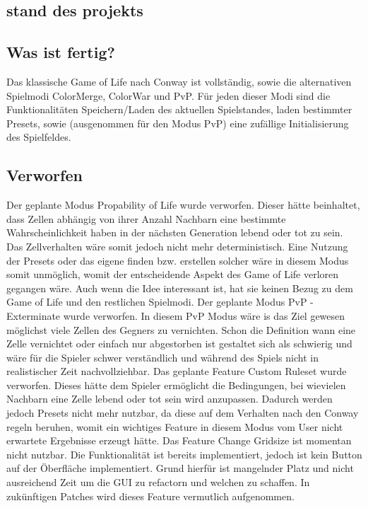 \documentclass[12pt]{article}
\theoremstyle{plain}
\begin{document}
\begin{linenumbers}
\section{stand des projekts}
\subsection{Was ist fertig?}
Das klassische Game of Life nach Conway ist vollständig, sowie die alternativen Spielmodi ColorMerge, ColorWar und PvP.
Für jeden dieser Modi sind die Funktionalitäten Speichern/Laden des aktuellen Spielstandes, laden bestimmter Presets, sowie (ausgenommen für den Modus PvP) eine zufällige Initialisierung des Spielfeldes.
\subsection{Verworfen}
Der geplante Modus Propability of Life wurde verworfen. Dieser hätte beinhaltet, dass Zellen abhängig von ihrer Anzahl Nachbarn eine bestimmte Wahrscheinlichkeit haben in der nächsten Generation lebend oder tot zu sein. Das Zellverhalten wäre somit jedoch nicht mehr deterministisch. Eine Nutzung der Presets oder das eigene finden bzw. erstellen solcher wäre in diesem Modus somit unmöglich, womit der entscheidende Aspekt des Game of Life verloren gegangen wäre. Auch wenn die Idee interessant ist, hat sie keinen Bezug zu dem Game of Life und den restlichen Spielmodi.
\newline
Der geplante Modus PvP - Exterminate wurde verworfen. In diesem PvP Modus wäre is das Ziel gewesen möglichst viele Zellen des Gegners zu vernichten. Schon die Definition wann eine Zelle vernichtet oder einfach nur abgestorben ist gestaltet sich als schwierig und wäre für die Spieler schwer verständlich und während des Spiels nicht in realistischer Zeit nachvollziehbar.
\newline
Das geplante Feature Custom Ruleset wurde verworfen. Dieses hätte dem Spieler ermöglicht die Bedingungen, bei wievielen Nachbarn eine Zelle lebend oder tot sein wird anzupassen. Dadurch werden jedoch Presets nicht mehr nutzbar, da diese auf dem Verhalten nach den Conway regeln beruhen, womit ein wichtiges Feature in diesem Modus vom User nicht erwartete Ergebnisse erzeugt hätte.
\newline
Das Feature Change Gridsize ist momentan nicht nutzbar. Die Funktionalität ist bereits implementiert, jedoch ist kein Button auf der Öberfläche implementiert. Grund hierfür ist mangelnder Platz und nicht ausreichend Zeit um die GUI zu refactorn und welchen zu schaffen. In zukünftigen Patches wird dieses Feature vermutlich aufgenommen.

\end{linenumbers}
\end{document}
